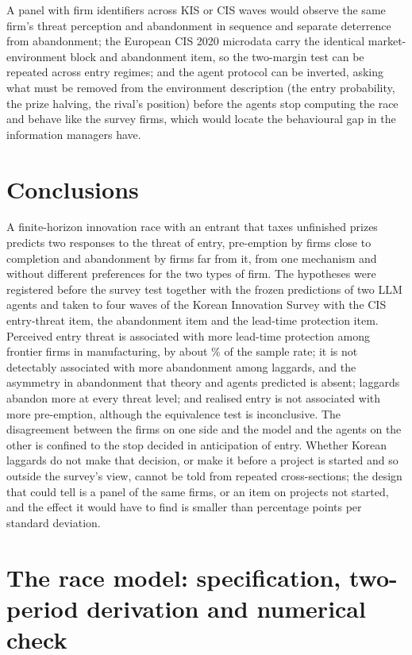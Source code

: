 \documentclass[preprint,12pt,authoryear]{elsarticle}
\begin{document}
A panel with firm identifiers across KIS or CIS waves would observe the same firm's threat perception and abandonment in sequence and separate deterrence from abandonment; the European CIS 2020 microdata carry the identical market-environment block and abandonment item, so the two-margin test can be repeated across entry regimes; and the agent protocol can be inverted, asking what must be removed from the environment description (the entry probability, the prize halving, the rival's position) before the agents stop computing the race and behave like the survey firms, which would locate the behavioural gap in the information managers have.

\section{Conclusions}

A finite-horizon innovation race with an entrant that taxes unfinished prizes predicts two responses to the threat of entry, pre-emption by firms close to completion and abandonment by firms far from it, from one mechanism and without different preferences for the two types of firm. The hypotheses were registered before the survey test together with the frozen predictions of two LLM agents and taken to four waves of the Korean Innovation Survey with the CIS entry-threat item, the abandonment item and the lead-time protection item. Perceived entry threat is associated with more lead-time protection among frontier firms in manufacturing, by about \KISHOneRelMeanPct\% of the sample rate; it is not detectably associated with more abandonment among laggards, and the asymmetry in abandonment that theory and agents predicted is absent; laggards abandon more at every threat level; and realised entry is not associated with more pre-emption, although the equivalence test is inconclusive. The disagreement between the firms on one side and the model and the agents on the other is confined to the stop decided in anticipation of entry. Whether Korean laggards do not make that decision, or make it before a project is started and so outside the survey's view, cannot be told from repeated cross-sections; the design that could tell is a panel of the same firms, or an item on projects not started, and the effect it would have to find is smaller than \MDEQuitPp{} percentage points per standard deviation.

\appendix

\section{The race model: specification, two-period derivation and numerical check}
\label{app:model}
\setcounter{equation}{0}
\renewcommand{\theequation}{A.\arabic{equation}}
\end{document}
